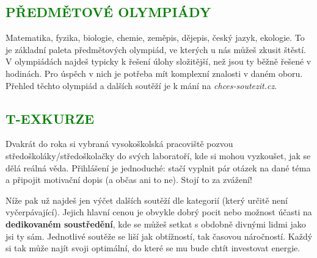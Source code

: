 \documentclass[a5paper, twoside]{article}
\newcommand{\podnadpis}[2]{
  \subsection*{\textcolor{#2}{#1}}
}
\begin{document}
\podnadpis{PŘEDMĚTOVÉ OLYMPIÁDY}{green}
Matematika, fyzika, biologie, chemie, zeměpis, dějepis, český jazyk, ekologie. To je základní paleta předmětových olympiád, ve kterých u nás můžeš zkusit štěstí. V olympiádách najdeš typicky k řešení úlohy složitější, než jsou ty běžně řešené v hodinách. Pro úspěch v nich je potřeba mít komplexní znalosti v daném oboru. Přehled těchto olympiád a dalších soutěží je k mání na \textit{chces-soutezit.cz}.

\podnadpis{T-EXKURZE}{green}
Dvakrát do roka si vybraná vysokoškolská pracoviště pozvou středoškoláky/středoškolačky do svých laboratoří, kde si mohou vyzkoušet, jak se dělá reálná věda. Přihlášení je jednoduché: stačí vyplnit pár otázek na dané téma a připojit motivační dopis (a občas ani to ne). Stojí to za zvážení!
\par \noindent Níže pak už najdeš jen výčet dalších soutěží dle kategorií (který určitě není vyčerpávající). Jejich hlavní cenou je obvykle dobrý pocit nebo možnost účasti na \textbf{dedikovaném soustředění}, kde se můžeš setkat s obdobně divnými lidmi jako jsi ty sám. Jednotlivé soutěže se liší jak obtížností, tak časovou náročností. Každý si tak může najít svoji optimální, do které se mu bude chtít investovat energie.
\end{document}

